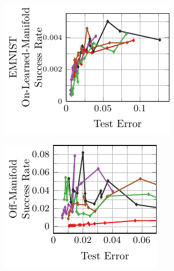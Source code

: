 \begin{appendix}
\begin{figure}[t]
\begin{subfigure}{0.245\textwidth}
        \centering
        \includegraphics[width=\textwidth]{appendix_transfer_emnist_error_on_learned.pdf}
    \end{subfigure}
    \begin{subfigure}{0.225\textwidth}
        \centering
        \includegraphics[width=\textwidth]{appendix_transfer_emnist_error_off.pdf}
    \end{subfigure}
    \\
    \begin{subfigure}{0.245\textwidth}
        \centering

\end{subfigure}
\end{figure}
\end{appendix}
